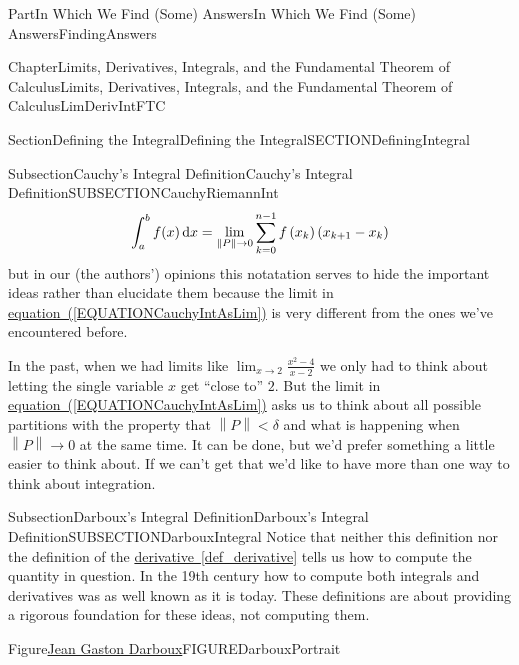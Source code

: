 \documentclass[oneside,10pt,]{book}
\newcommand{\xreffont}{\relax}
\numberwithin{equation}{part}
\newcommand{\norm}[1]{\left\|#1\right\|}
\newcommand{\dx}[1]{\,{\rm d}#1}
\def\limit#1#2#3{{\displaystyle\lim_{#1\rightarrow #2}#3}}
\def\limitt#1#2#3{{\displaystyle\lim_{#1\rightarrow #2}\textstyle #3}}
\newcommand{\lt}{<}
\begin{document}
\begin{partptx}{Part}{In Which We Find (Some) Answers}{}{In Which We Find (Some) Answers}{}{}{FindingAnswers}
\begin{chapterptx}{Chapter}{Limits, Derivatives, Integrals, and the Fundamental Theorem of Calculus}{}{Limits, Derivatives, Integrals, and the Fundamental Theorem of Calculus}{}{}{LimDerivIntFTC}
\begin{sectionptx}{Section}{Defining the Integral}{}{Defining the Integral}{}{}{SECTIONDefiningIntegral}
\begin{subsectionptx}{Subsection}{Cauchy's Integral Definition}{}{Cauchy's Integral Definition}{}{}{SUBSECTIONCauchyRiemannInt}
\begin{equation}
\int_a^bf(x)\dx{x} =
\limit{\norm{P}}{0}{\sum^{n-1}_{k=0}{f\left(x_k\right)\left(x_{k+1}-x_k\right)}}\label{EQUATIONCauchyIntAsLim}
\end{equation}
but in our (the authors') opinions this notatation serves to hide the important ideas rather than elucidate them because the limit in \hyperref[EQUATIONCauchyIntAsLim]{equation~({\xreffont\ref{EQUATIONCauchyIntAsLim}})} is very different from the ones we've encountered before.%
\par
In the past, when we had limits like \(\limitt{x}{2}{\frac{x^2-4}{x-2}}\) we only had to think about letting the single variable \(x\) get ``close to'' \(2\). But the limit in \hyperref[EQUATIONCauchyIntAsLim]{equation~({\xreffont\ref{EQUATIONCauchyIntAsLim}})} asks us to think about all possible partitions with the property that \(\norm{P}\lt\delta{}\) and what is happening when \(\norm{P} \rightarrow 0\) at the same time. It can be done, but we'd prefer something a little easier to think about. If we can't get that we'd like to have more than one way to think about integration.%
\end{subsectionptx}
%
%
\typeout{************************************************}
\typeout{************************************************}
%
\begin{subsectionptx}{Subsection}{Darboux's Integral Definition}{}{Darboux's Integral Definition}{}{}{SUBSECTIONDarbouxIntegral}
Notice that neither this definition nor the definition of the \hyperref[def_derivative]{derivative~{\xreffont\ref{def_derivative}}} tells us how to compute the quantity in question. In the 19th century how to compute both integrals and derivatives was as well known as it is today.  These definitions are about providing a rigorous foundation for these ideas, not computing them.%
\begin{figureptx}{Figure}{\href{https://mathshistory.st-andrews.ac.uk/Biographies/Darboux/}{Jean Gaston Darboux}\protect\footnotemark{}}{FIGUREDarbouxPortrait}{}%
\begin{image}{0.325}{0.35}{0.325}{}%

\end{image}
\end{figureptx}
\end{subsectionptx}
\end{sectionptx}
\end{chapterptx}
\end{partptx}
\end{document}
